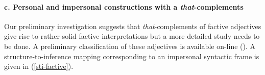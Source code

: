 \documentclass[10pt]{article}
\begin{document}

\vspace{-1.0em}
\paragraph{c. Personal and impersonal constructions with a \textit{that}-complements} 
Our preliminary investigation suggests that \textit{that}-complements of factive adjectives give rise to rather solid factive interpretations but a more detailed study needs to be done.  A preliminary classification of these adjectives is available on-line (\cite{faust-adj-pol-lex}). A structure-to-inference mapping corresponding to an impersonal syntactic frame is given in (\ref{sti-factive}).
\vspace{-0.5em}
\vspace{-0.5em}



\end{document}
